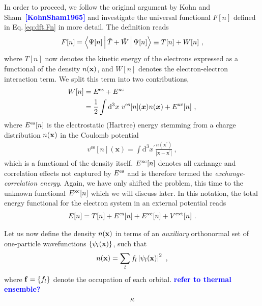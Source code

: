 \documentclass[a4paper,12pt]{book}
\newcommand{\REM}[1]{\textcolor{blue}{{\bf #1}}}
\newcommand{\CITE}[1]{\textcolor{blue}{{\bf [#1]}}}
\begin{document}
In order to proceed, we follow the original argument by Kohn and Sham~\CITE{KohnSham1965} and investigate the universal functional $F[n]$ defined in Eq.\,\eqref{eq:dft.Fn} in more detail. The definition reads
\begin{align}
	F[n] 
		= \Braket{\Psi [n] | \hat T + \hat W | \Psi [n]}
		\equiv T[n] + W[n]~,
	\label{eq:dft.Fn.2}
\end{align}
where $T[n]$ now denotes the kinetic energy of the electrons expressed as a functional of the density $n ({\bf x})$, and $W[n]$ denotes the electron-electron interaction term. We split this term into two contributions,
\begin{align}
	\begin{split}
	W[n] 
		&= E^{\rm es} + E^{\rm xc} \\
		&= \frac{1}{2} \int \mathrm{d}^{3} x ~ 
			v^{\mathrm{es}}[n](\boldsymbol{x}) n(\boldsymbol{x})+E^{\mathrm{xc}}[n]~,
	\end{split}
	\label{eq:dft.KS.W}
\end{align}
where $E^{\rm es} [n]$ is the electrostatic (Hartree) energy stemming from a charge distribution $n ({\bf x})$ in the Coulomb potential
\begin{align}
	v^{\mathrm{es}}[n](\boldsymbol{x})
		= \int \mathrm{d}^{3} x^{\prime} \frac{n\left(\boldsymbol{x}^{\prime}\right)}{\left|\boldsymbol{x}-\boldsymbol{x}^{\prime}\right|}~,
	\label{eq:dft.KS.ves}
\end{align}
which is a functional of the density itself. $E^{\rm xc} [n]$ denotes all exchange and correlation effects not captured by $E^{\rm es}$ and is therefore termed the \emph{exchange-correlation energy}. Again, we have only shifted the problem, this time to the unknown functional $E^{\rm xc} [n]$ which we will discuss later.
In this notation, the total energy functional for the electron system in an external potential reads
\begin{align}
	E[n]
		= T[n] +  E^{\rm es}[n] + E^{\rm xc} [n] + V^{\rm ext}[n]~.
	\label{eq:dft.Ks.En}
\end{align}

Let us now define the density $n({\bf x})$ in terms of an \emph{auxiliary} orthonormal set of one-particle wavefunctions $\{ \psi_l ({\bf x}) \}$, such that
\begin{align}
	n({\bf x}) = \sum_l f_l \left\lvert \psi_l ({\bf x}) \right\rvert^2~,
	\label{eq:dft.KS.n(psi)}
\end{align}
where ${\bf f}=\left\{f_{l}\right\}$ denote the occupation of each orbital. \REM{refer to thermal ensemble?}
$$\bf \kappa$$
\end{document}
